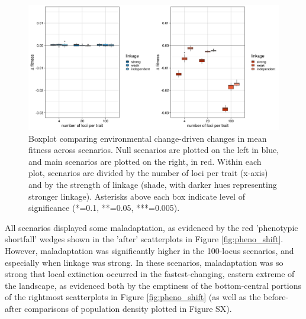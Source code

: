 \documentclass[9pt,twocolumn,twoside,lineno]{pnas-new}
\begin{document}
\begin{figure}
\centering
\includegraphics[width=11.4cm]{fit_boxplot.jpg}
\caption{Boxplot comparing environmental change-driven changes in mean fitness across scenarios. Null scenarios are plotted on the left in blue, and main scenarios are plotted on the right, in red. Within each plot, scenarios are divided by the number of loci per trait (x-axis) and by the strength of linkage (shade, with darker hues representing stronger linkage). Asterisks above each box indicate level of significance (*=0.1, **=0.05, ***=0.005).}
\label{fig:fit_boxplot}
\end{figure}

All scenarios displayed some maladaptation, as evidenced by the red 'phenotypic shortfall' wedges shown in the 'after' scatterplots in Figure \ref{fig:pheno_shift}. However, maladaptation was significantly higher in the 100-locus scenarios, and especially when linkage was strong.
In these scenarios, maladaptation was so strong that local extinction occurred
in the fastest-changing, eastern extreme of the landscape,
as evidenced both by the emptiness of the bottom-central portions
of the rightmost scatterplots in Figure \ref{fig:pheno_shift}
(as well as the before-after comparisons of population density plotted in
Figure SX).
\end{document}
